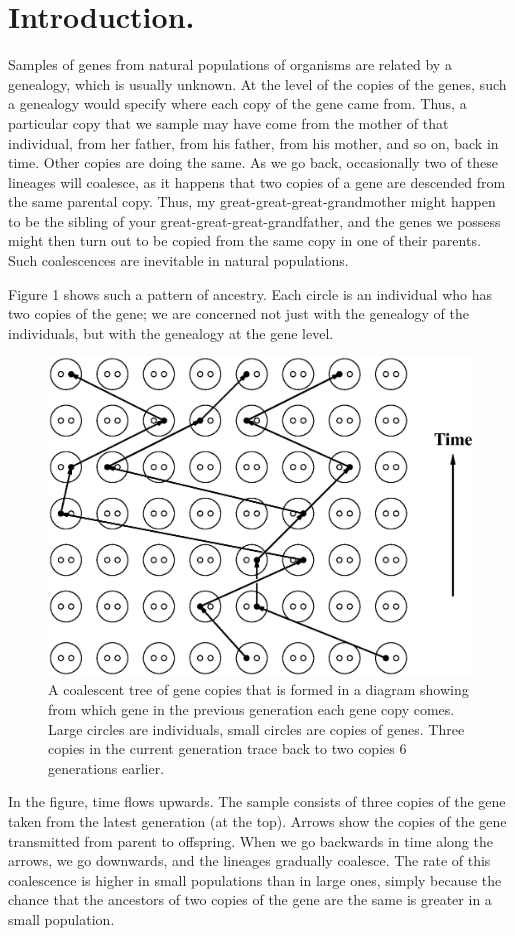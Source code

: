 
\section{Introduction.}

Samples of genes from natural populations of organisms are related by
a genealogy, which is usually unknown.  At the level of the copies of the
genes, such a genealogy would specify where each copy of the gene came from.
Thus, a particular copy that we sample may have come from the mother
of that individual, from her father, from his father, from his mother, and
so on, back in time.  Other copies are doing the same.  As we go back,
occasionally two of these lineages will coalesce, as it happens that
two copies of a gene are descended from the same parental copy.  Thus,
my great-great-great-grandmother might happen to be the sibling of your
great-great-great-grandfather, and the genes we possess might then turn out to
be copied from the same copy in one of their parents.  Such coalescences
are inevitable in natural populations.

Figure 1 shows such a pattern of
ancestry.  Each circle is an individual who has two copies of the gene; we are
concerned not just with the genealogy of the individuals, but with the
genealogy at the gene level.
\begin{figure} %
\centerline{\includegraphics[width=4.5in]{fig1.ps}}
\caption{A coalescent tree of gene copies that is formed in a diagram showing from
which gene in the previous generation each gene copy comes. Large circles are
individuals, small circles are copies of genes.  Three copies in the current
generation trace back to two copies 6 generations earlier.
}
\end{figure}
In the figure, time flows upwards.  The sample consists of three copies of
the gene taken from the latest generation (at the top).  Arrows show the
copies of the gene transmitted from parent to offspring.  When we go backwards
in time along the arrows, we go downwards, and the lineages gradually
coalesce.  The rate of this coalescence is higher in small populations than
in large ones, simply because the chance that the ancestors of two copies of
the gene are the same is greater in a small population.

